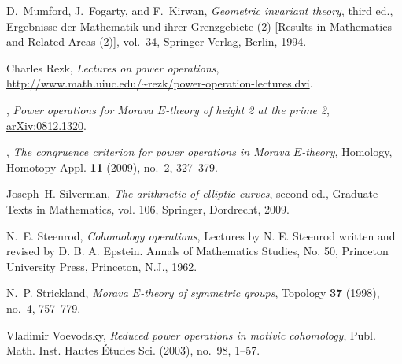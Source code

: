 \documentclass{gtpart}
\theoremstyle{definition}
\theoremstyle{remark}
\begin{document}
\begin{thebibliography}
D.~Mumford, J.~Fogarty, and F.~Kirwan, \emph{Geometric invariant theory}, third
  ed., Ergebnisse der Mathematik und ihrer Grenzgebiete (2) [Results in
  Mathematics and Related Areas (2)], vol.~34, Springer-Verlag, Berlin, 1994.

Charles Rezk, \emph{Lectures on power operations}, \url{http://www.math.uiuc.edu/~rezk/power-operation-lectures.dvi}.

\bysame, \emph{Power operations for {M}orava ${E}$-theory of height 2 at the
  prime 2}, \href{http://arxiv.org/abs/0812.1320}{arXiv:0812.1320}.

\bysame, \emph{The congruence criterion for power operations in {M}orava
  {$E$}-theory}, Homology, Homotopy Appl. \textbf{11} (2009), no.~2, 327--379.

Joseph~H. Silverman, \emph{The arithmetic of elliptic curves}, second ed.,
  Graduate Texts in Mathematics, vol. 106, Springer, Dordrecht, 2009.

N.~E. Steenrod, \emph{Cohomology operations}, Lectures by N. E. Steenrod
  written and revised by D. B. A. Epstein. Annals of Mathematics Studies, No.
  50, Princeton University Press, Princeton, N.J., 1962. 

N.~P. Strickland, \emph{Morava {$E$}-theory of symmetric groups}, Topology
  \textbf{37} (1998), no.~4, 757--779. 

Vladimir Voevodsky, \emph{Reduced power operations in motivic cohomology},
  Publ. Math. Inst. Hautes \'Etudes Sci. (2003), no.~98, 1--57. 

\end{thebibliography}
\end{document}
